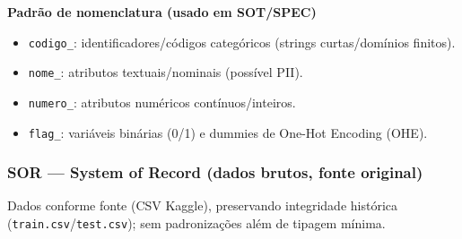 \documentclass[12pt,a4paper]{article}
\begin{document}
\vspace{0.5em}
\noindent\textbf{Padrão de nomenclatura (usado em SOT/SPEC)}
\begin{itemize}[leftmargin=1.25em]
  \item \texttt{codigo\_}: identificadores/códigos categóricos (strings curtas/domínios finitos).
  \item \texttt{nome\_}: atributos textuais/nominais (possível PII).
  \item \texttt{numero\_}: atributos numéricos contínuos/inteiros.
  \item \texttt{flag\_}: variáveis binárias (0/1) e dummies de One-Hot Encoding (OHE).
\end{itemize}

\subsubsection*{SOR — System of Record (dados brutos, fonte original)}
Dados conforme fonte (CSV Kaggle), preservando integridade histórica (\texttt{train.csv}/\texttt{test.csv}); sem padronizações além de tipagem mínima.
\end{document}
